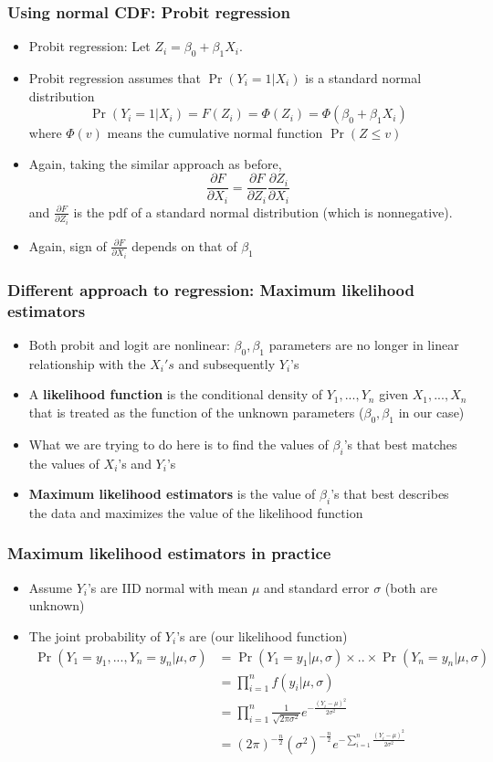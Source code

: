 \documentclass[aspectratio=169]{beamer}
\begin{document}
\begin{frame}
\frametitle{Using normal CDF: Probit regression}
\begin{itemize}
\item Probit regression: Let $Z_i=\beta_0+\beta_1X_i$. 
\item Probit regression assumes that $\Pr(Y_i=1|X_i)$  is a standard normal distribution
\[
\Pr(Y_i=1|X_i)=F(Z_i)=\Phi(Z_i)=\Phi(\beta_0+\beta_1X_i)
\]
where $\Phi(v)$ means the cumulative normal function $\Pr(Z\leq v)$
\item Again, taking the similar approach as before, 
\[
\frac{\partial F}{\partial X_i} = \frac{\partial F}{\partial Z_i}\frac{\partial Z_i}{\partial X_i} 
\]
and $\frac{\partial F}{\partial Z_i}$ is the pdf of a standard normal distribution (which is nonnegative).
\item Again, sign of $\frac{\partial F}{\partial X_i}$ depends on that of $\beta_1$
\end{itemize}
\end{frame}

\begin{frame}
\frametitle{Different approach to regression: Maximum likelihood estimators}
\begin{itemize}
\item Both probit and logit are nonlinear: $\beta_0, \beta_1$ parameters are no longer in linear relationship with the $X_i's$ and subsequently $Y_i$'s
\item A \textbf{likelihood function} is the conditional density of $Y_1,...,Y_n$ given $X_1,...,X_n$ that is treated as the function of the unknown parameters ($\beta_0, \beta_1$ in our case)
\item What we are trying to do here is to find the values of $\beta_i$'s that best matches the values of $X_i$'s and $Y_i$'s
\item \textbf{Maximum likelihood estimators} is the value of $\beta_i$'s that best describes the data and maximizes the value of the likelihood function
\end{itemize}
\end{frame}

\begin{frame}
\frametitle{Maximum likelihood estimators in practice}
\begin{itemize}
\item Assume $Y_i$'s are IID normal with mean $\mu$ and standard error $\sigma$ (both are unknown)
\item The joint probability of $Y_i$'s are (our likelihood function)
\[
\begin{aligned}
\Pr(Y_1=y_1,...,Y_n=y_n|\mu,\sigma)&=\Pr(Y_1 = y_1|\mu,\sigma)\times..\times\Pr(Y_n=y_n|\mu,\sigma)\\
&=\prod_{i=1}^nf(y_i|\mu,\sigma)\\
&=\prod_{i=1}^n\frac{1}{\sqrt{2\pi\sigma^2}}e^{-\frac{(Y_i-\mu)^2}{2\sigma^2}}\\
&=(2\pi)^{-\frac{n}{2}} (\sigma^2)^{-\frac{n}{2}}e^{-\sum_{i=1}^n\frac{(Y_i-\mu)^2}{2\sigma^2}}\\
\end{aligned}
\]
\end{itemize}
\end{frame}
\end{document}
